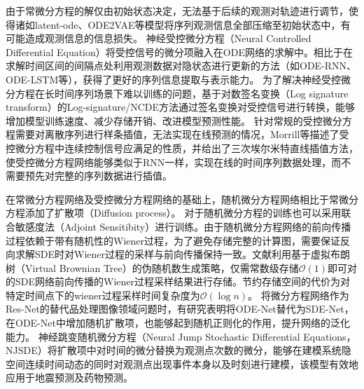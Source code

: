 由于常微分方程的解仅由初始状态决定，无法基于后续的观测对轨迹进行调节，使得诸如latent-ode、ODE2VAE等模型将序列观测信息全部压缩至初始状态中，有可能造成观测信息的信息损失。
神经受控微分方程（Neural Controlled Differential Equation）\cite{kidger2020neural}将受控信号的微分项融入在ODE网络的求解中。相比于在求解时间区间的间隔点处利用观测数据对隐状态进行更新的方法（如ODE-RNN、ODE-LSTM等），获得了更好的序列信息提取与表示能力。
为了解决神经受控微分方程在长时间序列场景下难以训练的问题，基于对数签名变换（Log signature transform）的Log-signature/NCDE方法\cite{morrill2021neural}通过签名变换对受控信号进行转换，能够增加模型训练速度、减少存储开销、改进模型预测性能。
针对常规的受控微分方程需要对离散序列进行样条插值，无法实现在线预测的情况，Morrill等\cite{morrill2021online}描述了受控微分方程中连续控制信号应满足的性质，并给出了三次埃尔米特直线插值方法，使受控微分方程网络能够类似于RNN一样，实现在线的时间序列数据处理，而不需要预先对完整的序列数据进行插值。

在常微分方程网络及受控微分方程网络的基础上，随机微分方程网络相比于常微分方程添加了扩散项（Diffusion process）。
对于随机微分方程的训练也可以采用联合敏感度法（Adjoint Sensitibity）进行训练\cite{li2020scalable}。由于随机微分方程网络的前向传播过程依赖于带有随机性的Wiener过程，为了避免存储完整的计算图，需要保证反向求解SDE时对Wiener过程的采样与前向传播保持一致。文献\cite{li2020scalable}利用基于虚拟布朗树（Virtual Brownian Tree）的伪随机数生成策略，仅需常数级存储$\mathcal{O}(1)$即可对的SDE网络前向传播的Wiener过程采样结果进行存储。节约存储空间的代价为对特定时间点下的wiener过程采样时间复杂度为$\mathcal{O}(\log n)$。
将微分方程网络作为Res-Net的替代品处理图像领域问题时，有研究表明将ODE-Net替代为SDE-Net，在ODE-Net中增加随机扩散项，也能够起到随机正则化的作用，提升网络的泛化能力\cite{Oganesyan2020}。
神经跳变随机微分方程（Neural Jump Stochastic Differential Equations，NJSDE）\cite{Jia2019}将扩散项中对时间的微分替换为观测点次数的微分，能够在建模系统隐空间连续时间动态的同时对观测点出现事件本身以及时刻进行建模，该模型有效地应用于地震预测及药物预测。

